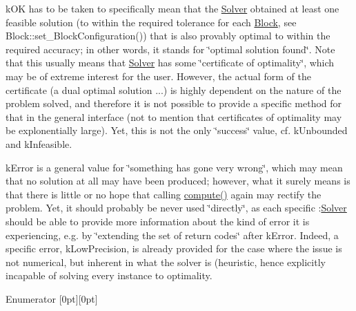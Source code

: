 \begin{DoxyItemize}
\item k\+OK has to be taken to specifically mean that the \mbox{\hyperlink{class_s_m_spp__di__unipi__it_1_1_solver}{Solver}} obtained at least one feasible solution (to within the required tolerance for each \mbox{\hyperlink{class_s_m_spp__di__unipi__it_1_1_block}{Block}}, see Block\+::set\+\_\+\+Block\+Configuration()) that is also provably optimal to within the required accuracy; in other words, it stands for \char`\"{}optimal solution found\char`\"{}. Note that this usually means that \mbox{\hyperlink{class_s_m_spp__di__unipi__it_1_1_solver}{Solver}} has some \char`\"{}certificate of optimality\char`\"{}, which may be of extreme interest for the user. However, the actual form of the certificate (a dual optimal solution ...) is highly dependent on the nature of the problem solved, and therefore it is not possible to provide a specific method for that in the general interface (not to mention that certificates of optimality may be explonentially large). Yet, this is not the only \char`\"{}success\char`\"{} value, cf. k\+Unbounded and k\+Infeasible.
\item k\+Error is a general value for \char`\"{}something has gone very wrong\char`\"{}, which may mean that no solution at all may have been produced; however, what it surely means is that there is little or no hope that calling \mbox{\hyperlink{class_s_m_spp__di__unipi__it_1_1_solver_a504d4e3e174c7a518cc66156a8a45ce5}{compute()}} again may rectify the problem. Yet, it should probably be never used \char`\"{}directly\char`\"{}, as each specific \+:\mbox{\hyperlink{class_s_m_spp__di__unipi__it_1_1_solver}{Solver}} should be able to provide more information about the kind of error it is experiencing, e.\+g. by \char`\"{}extending the set of return codes\char`\"{} after k\+Error. Indeed, a specific error, k\+Low\+Precision, is already provided for the case where the issue is not numerical, but inherent in what the solver is (heuristic, hence explicitly incapable of solving every instance to optimality. 
\end{DoxyItemize}\begin{DoxyEnumFields}{Enumerator}
[0pt][0pt]{}\mbox{\label{class_s_m_spp__di__unipi__it_1_1_solver_a2e0367580e249e8e6018c919bee5481da4b9de95ee3087851acd98262e09f0be8}} 

\end{DoxyEnumFields}
